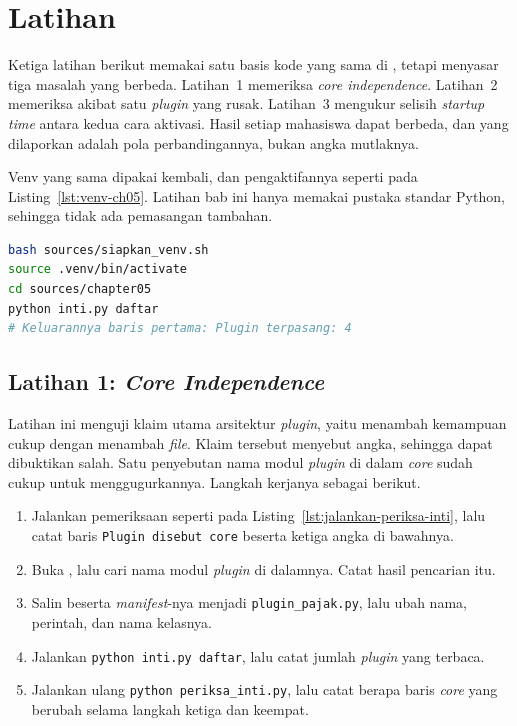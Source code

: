 \section{Latihan}

Ketiga latihan berikut memakai satu basis kode yang sama di
, tetapi menyasar tiga masalah yang berbeda.
Latihan~1 memeriksa \textit{core independence}. Latihan~2
memeriksa akibat satu \textit{plugin} yang rusak. Latihan~3 mengukur selisih
\textit{startup time} antara kedua cara aktivasi. Hasil setiap mahasiswa dapat berbeda,
dan yang dilaporkan adalah pola perbandingannya, bukan angka mutlaknya.

Venv yang sama dipakai kembali, dan pengaktifannya seperti pada
Listing~\ref{lst:venv-ch05}. Latihan bab ini hanya memakai pustaka standar
Python, sehingga tidak ada pemasangan tambahan.

\begin{lstlisting}[language=bash, caption={Mengaktifkan venv sebelum ketiga
  latihan, skrip tersedia di \berkas{sources/siapkan_venv.sh}},
  label=lst:venv-ch05]
bash sources/siapkan_venv.sh
source .venv/bin/activate
cd sources/chapter05
python inti.py daftar
# Keluarannya baris pertama: Plugin terpasang: 4
\end{lstlisting}

\subsection*{Latihan 1: \textit{Core Independence}}

Latihan ini menguji klaim utama arsitektur \textit{plugin}, yaitu menambah
kemampuan cukup dengan menambah \textit{file}. Klaim tersebut menyebut angka, sehingga
dapat dibuktikan salah. Satu penyebutan nama modul \textit{plugin} di dalam \textit{core}
sudah cukup untuk menggugurkannya. Langkah kerjanya sebagai berikut.

\begin{enumerate}
  \item Jalankan pemeriksaan seperti pada Listing~\ref{lst:jalankan-periksa-inti},
    lalu catat baris \texttt{Plugin disebut core} beserta ketiga angka di
    bawahnya.
  \item Buka , lalu cari nama modul
    \textit{plugin} di dalamnya. Catat hasil pencarian itu.
  \item Salin  beserta
    \textit{manifest}-nya menjadi \texttt{plugin\_pajak.py}, lalu ubah nama, perintah, dan
    nama kelasnya.
  \item Jalankan \texttt{python inti.py daftar}, lalu catat jumlah
    \textit{plugin} yang terbaca.
  \item Jalankan ulang \texttt{python periksa\_inti.py}, lalu catat berapa baris
    \textit{core} yang berubah selama langkah ketiga dan keempat.
\end{enumerate}

